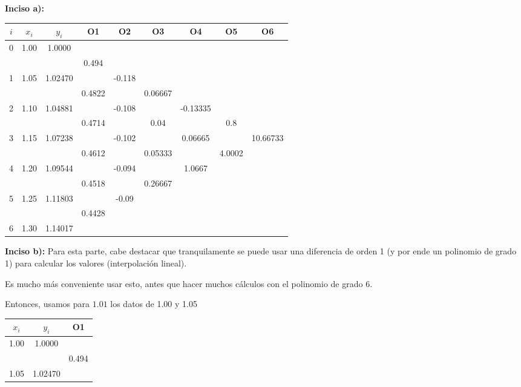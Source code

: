 \documentclass[11pt]{article}
\begin{document}
	\textbf{Inciso a):}\\
	\begin{tabular}{|c c c c c c c c c|}
		\hline
		$i$ & $x_i$ & $y_i$ & O1 & O2 & O3 & O4 & O5 & O6\\
		\hline
		0 & 1.00 & 1.0000  &        &        &         &          & &\\
		  &      &         & 0.494  &        &         &          & &\\
		1 & 1.05 & 1.02470 &        & -0.118 &         &          & &\\
		  &      &         & 0.4822 &        & 0.06667 &          & &\\
		2 & 1.10 & 1.04881 &        & -0.108 &         & -0.13335 & &\\
		  &      & 		   & 0.4714 &        & 0.04    &          & 0.8 &\\
		3 & 1.15 & 1.07238 &        & -0.102 &         & 0.06665  & & 10.66733 \\
		  &      & 		   & 0.4612 &        & 0.05333 &          & 4.0002 &\\
		4 & 1.20 & 1.09544 &        & -0.094 &         & 1.0667   & &\\
		  &      & 		   & 0.4518 &        & 0.26667 &          & &\\
		5 & 1.25 & 1.11803 &        & -0.09  &         &          & &\\
		  &      & 		   & 0.4428 &        &         &          & &\\
		6 & 1.30 & 1.14017 &        &        &         &          & &\\
		\hline
	\end{tabular}

	\textbf{Inciso b):}
	Para esta parte, cabe destacar que tranquilamente se puede usar una diferencia de orden 1 (y por ende un polinomio de grado 1) para calcular los valores (interpolación lineal).
	
	Es mucho más conveniente usar esto, antes que hacer muchos cálculos con el polinomio de grado 6.
	
	Entonces, usamos para $1.01$ los datos de 1.00 y 1.05
	
	\begin{tabular}{|c c c|}
		\hline
		$x_i$ & $y_i$ & O1\\
		\hline
		1.00 & 1.0000 & \\
		& & 0.494\\
		1.05 & 1.02470 & \\
		\hline
	\end{tabular}
	
\end{document}

